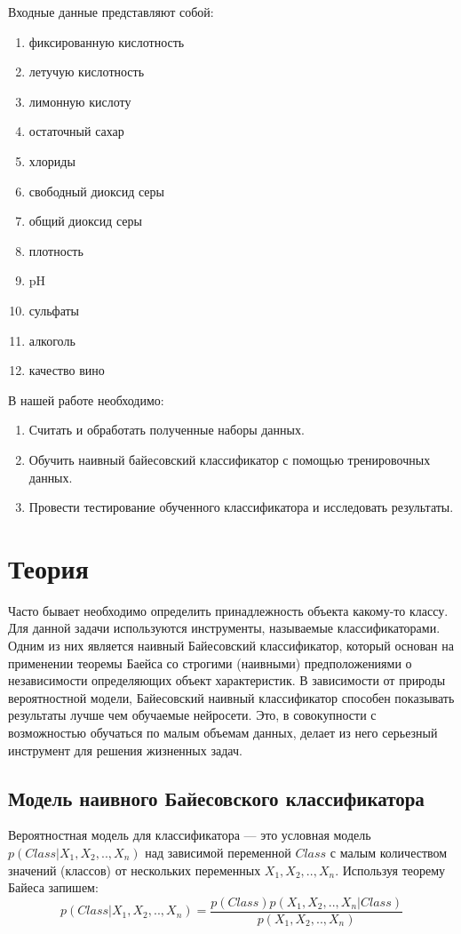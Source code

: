 \documentclass{article}
\begin{document}
Входные данные представляют собой:
\begin{enumerate}
    \item фиксированную кислотность
    \item летучую кислотность
    \item лимонную кислоту
    \item остаточный сахар
    \item хлориды
    \item свободный диоксид серы
    \item общий диоксид серы
    \item плотность
    \item pH
    \item сульфаты
    \item алкоголь
    \item качество вино
    
\end{enumerate}




\noindent В нашей работе необходимо:
\begin{enumerate}
    \item Считать и обработать полученные наборы данных.
    \item Обучить наивный байесовский классификатор с помощью тренировочных данных.
    \item Провести тестирование обученного классификатора и исследовать результаты.
\end{enumerate}

\section{Теория}
Часто бывает необходимо определить принадлежность объекта какому-то классу. Для данной задачи используются инструменты, называемые классификаторами. Одним из них является наивный Байесовский классификатор, который основан на применении теоремы Баейса со строгими (наивными) предположениями о независимости определяющих объект характеристик. В зависимости от природы вероятностной модели, Байесовский наивный классификатор способен показывать результаты лучше чем обучаемые нейросети. Это, в совокупности с возможностью обучаться по малым объемам данных, делает из него серьезный инструмент для решения жизненных задач.

\subsection{Модель наивного Байесовского классификатора}
Вероятностная модель для классификатора — это условная модель $p(Class|X_1,X_2,..,X_n)$ над зависимой переменной $Class$ с малым количеством значений (классов) от нескольких переменных $X_1,X_2,..,X_n$.  Используя теорему Байеса запишем: $$p(Class|X_1,X_2,..,X_n)= \frac{p(Class)p(X_1,X_2,..,X_n|Class)}{p(X_1,X_2,..,X_n)}$$
\end{document}
